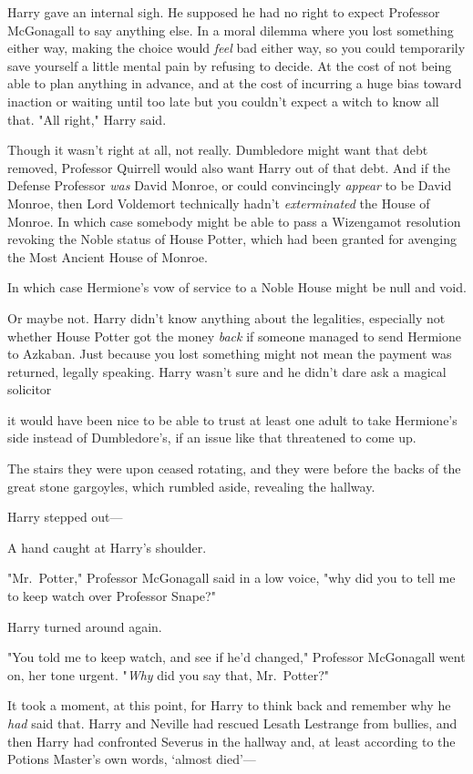 Harry gave an internal sigh. He supposed he had no right to expect Professor
McGonagall to say anything else. In a moral dilemma where you lost something
either way, making the choice would \emph{feel} bad either way, so you could
temporarily save yourself a little mental pain by refusing to decide. At the
cost of not being able to plan anything in advance, and at the cost of
incurring a huge bias toward inaction or waiting until too late{\el} but you
couldn't expect a witch to know all that. "All right," Harry said.

Though it wasn't right at all, not really. Dumbledore might want that debt
removed, Professor Quirrell would also want Harry out of that debt. And if the
Defense Professor \emph{was} David Monroe, or could convincingly \emph{appear}
to be David Monroe, then Lord Voldemort technically hadn't \emph{exterminated}
the House of Monroe. In which case somebody might be able to pass a Wizengamot
resolution revoking the Noble status of House Potter, which had been granted
for avenging the Most Ancient House of Monroe.

In which case Hermione's vow of service to a Noble House might be null and void.

Or maybe not. Harry didn't know anything about the legalities, especially not
whether House Potter got the money \emph{back} if someone managed to send
Hermione to Azkaban. Just because you lost something might not mean the payment
was returned, legally speaking. Harry wasn't sure and he didn't dare ask a
magical solicitor{\el}

{\el} it would have been nice to be able to trust at least one adult to take
Hermione's side instead of Dumbledore's, if an issue like that threatened to
come up.

The stairs they were upon ceased rotating, and they were before the backs of
the great stone gargoyles, which rumbled aside, revealing the hallway.

Harry stepped out---

A hand caught at Harry's shoulder.

"Mr.~Potter," Professor McGonagall said in a low voice, "why did you to tell me
to keep watch over Professor Snape?"

Harry turned around again.

"You told me to keep watch, and see if he'd changed," Professor McGonagall went
on, her tone urgent. "\emph{Why} did you say that, Mr.~Potter?"

It took a moment, at this point, for Harry to think back and remember why he
\emph{had} said that. Harry and Neville had rescued Lesath Lestrange from
bullies, and then Harry had confronted Severus in the hallway and, at least
according to the Potions Master's own words, `almost died'---

